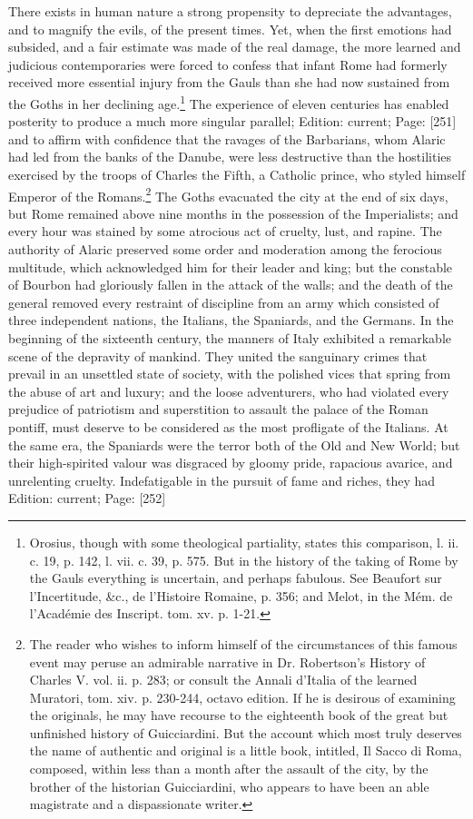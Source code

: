 There exists in human nature a strong propensity to depreciate the advantages, and to magnify the evils, of the present times. Yet, when the first emotions had subsided, and a fair estimate was made of the real damage, the more learned and judicious contemporaries were forced to confess that infant Rome had formerly received more essential injury from the Gauls than she had now sustained from the Goths in her declining age.\footnote{Orosius, though with some theological partiality, states this comparison, l. ii. c. 19, p. 142, l. vii. c. 39, p. 575. But in the history of the taking of Rome by the Gauls everything is uncertain, and perhaps fabulous. See Beaufort sur l\texthebrew{}’Incertitude, \&c., de l\texthebrew{}’Histoire Romaine, p. 356; and Melot, in the Mém. de l\texthebrew{}’Académie des Inscript. tom. xv. p. 1-21.} The experience of eleven centuries has enabled posterity to produce a much more singular parallel; Edition: current; Page: [251] and to affirm with confidence that the ravages of the Barbarians, whom Alaric had led from the banks of the Danube, were less destructive than the hostilities exercised by the troops of Charles the Fifth, a Catholic prince, who styled himself Emperor of the Romans.\footnote{The reader who wishes to inform himself of the circumstances of this famous event may peruse an admirable narrative in Dr. Robertson\texthebrew{}’s History of Charles V. vol. ii. p. 283; or consult the Annali d\texthebrew{}’Italia of the learned Muratori, tom. xiv. p. 230-244, octavo edition. If he is desirous of examining the originals, he may have recourse to the eighteenth book of the great but unfinished history of Guicciardini. But the account which most truly deserves the name of authentic and original is a little book, intitled, Il Sacco di Roma, composed, within less than a month after the assault of the city, by the brother of the historian Guicciardini, who appears to have been an able magistrate and a dispassionate writer.} The Goths evacuated the city at the end of six days, but Rome remained above nine months in the possession of the Imperialists; and every hour was stained by some atrocious act of cruelty, lust, and rapine. The authority of Alaric preserved some order and moderation among the ferocious multitude, which acknowledged him for their leader and king; but the constable of Bourbon had gloriously fallen in the attack of the walls; and the death of the general removed every restraint of discipline from an army which consisted of three independent nations, the Italians, the Spaniards, and the Germans. In the beginning of the sixteenth century, the manners of Italy exhibited a remarkable scene of the depravity of mankind. They united the sanguinary crimes that prevail in an unsettled state of society, with the polished vices that spring from the abuse of art and luxury; and the loose adventurers, who had violated every prejudice of patriotism and superstition to assault the palace of the Roman pontiff, must deserve to be considered as the most profligate of the Italians. At the same era, the Spaniards were the terror both of the Old and New World; but their high-spirited valour was disgraced by gloomy pride, rapacious avarice, and unrelenting cruelty. Indefatigable in the pursuit of fame and riches, they had Edition: current; Page: [252] 
